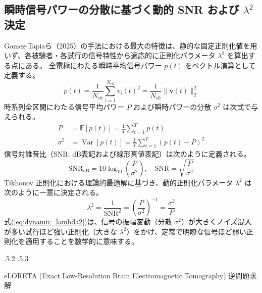 \documentclass[platex,dvipdfmx,12pt]{jsarticle}
\makeatletter
\renewcommand{\section}{%
  \clearpage
  \@startsection{section}{1}{\z@}%
  {\Cvs \@plus.5\Cdp \@minus.2\Cdp}%
  {.5\Cvs \@plus.3\Cdp}%
  {\normalfont\LARGE\headfont\raggedright}%
}
\makeatother
\begin{document}
\subsection{瞬時信号パワーの分散に基づく動的 SNR および $\lambda^2$ 決定}
Gomez-Tapiaら（2025）の手法における最大の特徴は、静的な固定正則化値を用いず、各被験者・各試行の信号特性から適応的に正則化パラメータ $\lambda^2$ を算出する点にある\cite{gomez2025evaluation}。
全電極にわたる瞬時平均信号パワー $p(t)$ をベクトル演算として定義する。
\begin{equation}
  p(t) = \frac{1}{N_{ch}} \sum_{i=1}^{N_{ch}} v_i(t)^2 = \frac{1}{N_{ch}} \|\mathbf{v}(t)\|_2^2
  \label{eq:instantaneous_power}
\end{equation}
時系列全区間にわたる信号平均パワー $P$ および瞬時パワーの分散 $\sigma^2$ は次式で与えられる。
\begin{align}
  P &= \mathbb{E}[p(t)] = \frac{1}{T} \sum_{t=1}^T p(t) \label{eq:mean_power}\\
  \sigma^2 &= \operatorname{Var}[p(t)] = \frac{1}{T} \sum_{t=1}^T (p(t) - P)^2 \label{eq:var_power}
\end{align}
信号対雑音比（SNR: dB表記および線形真値表記）は次のように定義される。
\begin{equation}
  \text{SNR}_{\text{dB}} = 10 \log_{10}\left( \frac{P}{\sigma^2} \right), \quad \text{SNR} = \sqrt{\frac{P}{\sigma^2}}
  \label{eq:snr_definition}
\end{equation}
Tikhonov 正則化における理論的最適解に基づき、動的正則化パラメータ $\lambda^2$ は次のように一意に決定される。
\begin{equation}
  \lambda^2 = \frac{1}{\text{SNR}^2} = \left( \frac{P}{\sigma^2} \right)^{-1} = \frac{\sigma^2}{P}
  \label{eq:dynamic_lambda2}
\end{equation}
式(\ref{eq:dynamic_lambda2})は、信号の振幅変動（分散 $\sigma^2$）が大きくノイズ混入が多い試行ほど強い正則化（大きな $\lambda^2$）をかけ、定常で明瞭な信号ほど弱い正則化を適用することを数学的に意味する。

\section{eLORETA (Exact Low-Resolution Brain Electromagnetic Tomography) 逆問題求解}
\end{document}
